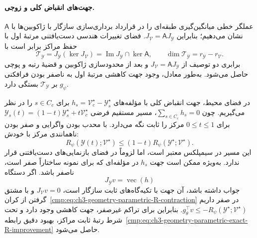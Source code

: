\paragraph{جهت‌های انقباض کلی و زوجی.}
عملگر خطی میانگین‌گیری طبقه‌ای را در قرارداد برداری‌سازی سازگار با ژاکوبین‌ها با $\mathsf A$ نشان می‌دهیم؛ بنابراین $J_{\mathcal V}=\mathsf A J_{\mathscr Y}$. فضای تغییرات هندسی دست‌یافتنی مرتبهٔ اول با حفظ مراکز برابر است با
\begin{equation}\label{cmp:eq:ch3-geometry-parametric-geometric-tangent}
\mathcal T_{\mathscr Y}
=J_{\mathscr Y}(\ker J_{\mathcal V})
=\operatorname{Im}J_{\mathscr Y}\cap\ker\mathsf A,
\qquad
\dim\mathcal T_{\mathscr Y}=r_{\mathscr Y}-r_{\mathcal V}.
\end{equation}
برابری دو توصیف از $J_{\mathcal V}=\mathsf A J_{\mathscr Y}$ و بعد از محدودسازی ژاکوبین و قضیهٔ رتبه و پوچی حاصل می‌شود. به‌طور معادل، وجود جهت کاهشی مرتبهٔ اول به ناصفر بودن فرافکنی $g_\psi$ بر $\mathcal T_{\mathscr Y}$ بستگی دارد.

در فضای محیط، جهت انقباض کلی با مؤلفه‌های $h_s=\mathcal V_c^\star-\mathscr Y_s^\star$ برای $s\in C_c$ را در نظر می‌گیریم. چون $\sum_{s\in C_c}h_s=0$، مسیر مستقیم فرضی $\mathscr Y_s(t)=(1-t)\mathscr Y_s^\star+t\mathcal V_c^\star$ برای $0\le t\le1$ مرکز را ثابت نگه می‌دارد. با محدب بودن واگرایی و صفر بودن ناهمانندی مرکز با خودش:
\begin{equation}\label{cmp:eq:ch3-geometry-parametric-R-contraction}
R_\psi(\mathscr Y(t);\mathcal V^\star)
\le(1-t)R_\psi(\mathscr Y^\star;\mathcal V^\star).
\end{equation}
این مسیر در سیمپلکس معتبر است، اما لزوماً در فضای بازنمایی‌های دست‌یافتنی قرار ندارد. به‌ویژه ممکن است جهت $h_s$ در مؤلفه‌ای که برای نمونه ساختاراً صفر است، ناصفر باشد. اگر دستگاه
\begin{equation}\label{cmp:eq:ch3-geometry-parametric-R-contraction-lift}
J_{\mathscr Y}v=\operatorname{vec}(h)
\end{equation}
جواب داشته باشد، آن جهت با تکیه‌گاه‌های ثابت سازگار است، $J_{\mathcal V}v=0$ و با مشتق گرفتن از کران~\eqref{cmp:eq:ch3-geometry-parametric-R-contraction} در صفر داریم $g_\theta^\top v\le-R_\psi(\mathscr Y^\star;\mathcal V^\star)$. بنابراین برای تراکم غیرصفر، جهت کاهشی وجود دارد و تحت شرط رتبهٔ ثابت مراکز، بهبود دقیق رابطه~\eqref{cmp:eq:ch3-geometry-parametric-exact-R-improvement} حاصل می‌شود.

